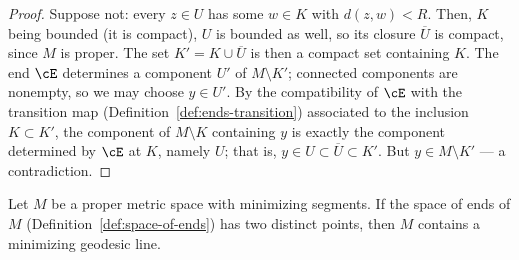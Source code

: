 \begin{proof}
\leanok
{}
Suppose not: every $z\in U$ has some $w\in K$ with $d(z,w)<R$.
Then, $K$ being bounded (it is compact), $U$ is bounded as well, so
its closure $\overline{U}$ is compact, since $M$ is proper. The set
$K'=K\cup\overline{U}$ is then a compact set containing $K$. The
end $\cE$ determines a component $U'$ of $M\setminus K'$; connected
components are nonempty, so we may choose $y\in U'$. By the
compatibility of $\cE$ with the transition map
(Definition~\ref{def:ends-transition}) associated to the inclusion
$K\subset K'$, the component of $M\setminus K$ containing $y$ is
exactly the component determined by $\cE$ at $K$, namely $U$; that
is, $y\in U\subset\overline{U}\subset K'$. But $y\in M\setminus K'$
--- a contradiction.
\end{proof}

\begin{lemma}
\label{lem:line-exists-metric}
\leanok
{}
Let $M$ be a proper metric space with minimizing segments. If the
space of ends of $M$ (Definition~\ref{def:space-of-ends}) has two
distinct points, then $M$ contains a minimizing geodesic line.
\end{lemma}

